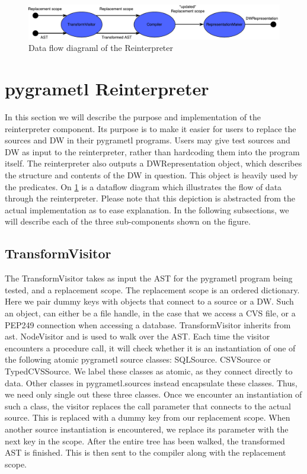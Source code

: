 \begin{figure}
  \centering
  \includegraphics[width=1\textwidth]{figures/reinterpreter.pdf}
  \caption{Data flow diagraml of the Reinterpreter}
  \label{fig:reinterpreter}
\end{figure}


\section{pygrametl Reinterpreter}
In this section we will describe the purpose and implementation of the reinterpreter component. Its purpose is to make it easier for users to replace the sources and DW in their pygrametl programs. Users may give test sources and DW as input to the reinterpreter, rather than hardcoding them into the program itself. The reinterpreter also outputs a DWRepresentation object, which describes the structure and contents of the DW in question. This object is heavily used by the predicates. On \cref{fig:reinterpreter} is a dataflow diagram which illustrates the flow of data through the reinterpreter. Please note that this depiction is abstracted from the actual implementation as to ease explanation. In the following subsections, we will describe each of the three sub-components shown on the figure.

\subsection{TransformVisitor}
The TransformVisitor takes as input the AST for the pygrametl program being tested, and a replacement scope. The replacement scope is an ordered dictionary. Here we pair dummy keys with objects that connect to  a source or a DW. Such an object, can either be a file handle, in the case that we access a CVS file, or a PEP249 connection when accessing a database. TransformVisitor inherits from ast. NodeVisitor and is used to walk over the AST. Each time the visitor encounters a procedure call, it will check whether it is an instantiation of one of the following atomic pygrametl source classes: SQLSource. CSVSource or TypedCVSSource. We label these classes as atomic, as they connect directly to data. Other classes in pygrametl.sources instead encapsulate these classes. Thus, we need only single out these three classes. Once we encounter an instantiation of such a class, the visitor replaces the call parameter that connects to the actual source. This is replaced with a dummy key from our replacement scope.  When another source instantiation is encountered, we replace its parameter with the next key in the scope. After the entire tree has been walked, the transformed AST is finished. This is then sent to the compiler along with the replacement scope. 

